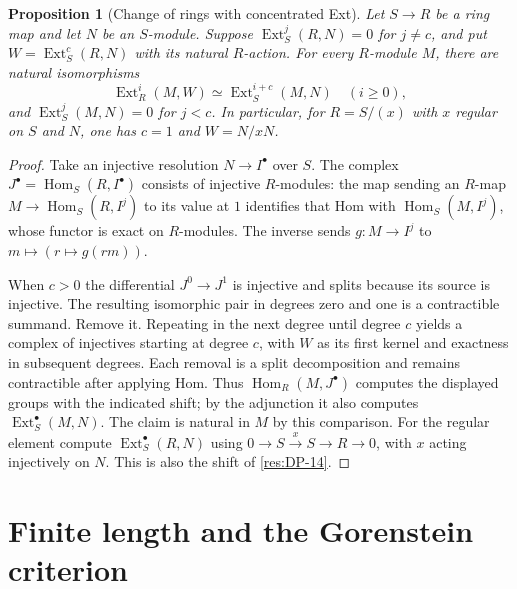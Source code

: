 \documentclass[11pt,oneside,openany]{book}
\newtheorem{proposition}[theorem]{Proposition}
\theoremstyle{definition}
\theoremstyle{remark}
\begin{document}
\begin{proposition}[Change of rings with concentrated Ext]
\label{res:GC-03}
Let $S\to R$ be a ring map and let $N$ be an $S$-module. Suppose
$\operatorname{Ext}^j_S(R,N)=0$ for $j\ne c$, and put
$W=\operatorname{Ext}^c_S(R,N)$ with its natural $R$-action.
For every $R$-module $M$, there are natural isomorphisms
\[
 \operatorname{Ext}^{i}_R(M,W)\simeq
 \operatorname{Ext}^{i+c}_S(M,N)\quad (i\ge0),
\]
and $\operatorname{Ext}^j_S(M,N)=0$ for $j<c$.
In particular, for $R=S/(x)$ with $x$ regular on $S$ and $N$,
one has $c=1$ and $W=N/xN$.
\end{proposition}
\begin{proof}
Take an injective resolution $N\to I^\bullet$ over $S$.
The complex $J^\bullet=\operatorname{Hom}_S(R,I^\bullet)$
consists of injective $R$-modules: the map sending an
$R$-map $M\to\operatorname{Hom}_S(R,I^j)$ to its value at $1$
identifies that Hom with $\operatorname{Hom}_S(M,I^j)$,
whose functor is exact on $R$-modules. The inverse sends
$g:M\to I^j$ to $m\mapsto(r\mapsto g(rm))$.

When $c>0$ the differential $J^0\to J^1$ is injective and
splits because its source is injective. The resulting isomorphic
pair in degrees zero and one is a contractible summand. Remove it.
Repeating in the next degree until degree $c$ yields a complex
of injectives starting at degree $c$, with $W$ as its first kernel
and exactness in subsequent degrees. Each removal is a split
decomposition and remains contractible after applying Hom.
Thus $\operatorname{Hom}_R(M,J^\bullet)$ computes the displayed
groups with the indicated shift; by the adjunction it also
computes $\operatorname{Ext}_S^\bullet(M,N)$. The claim is natural
in $M$ by this comparison. For the regular element compute
$\operatorname{Ext}_S^\bullet(R,N)$ using
$0\to S\xrightarrow{x}S\to R\to0$, with $x$ acting injectively
on $N$. This is also the shift of \ref{res:DP-14}.
\end{proof}

\section{Finite length and the Gorenstein criterion}
\end{document}
